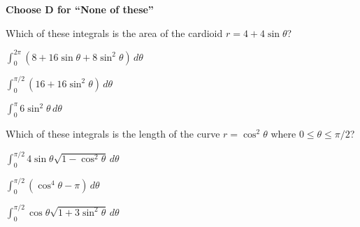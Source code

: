 \documentclass[12pt]{exam}
\newcommand{\<}{(}
\renewcommand{\>}{)}
\begin{document}
\begin{center}
\end{center}
\vspace{0.1in}

\vspace{12pt}

\textbf{Choose D for ``None of these''}

\begin{questions}\setcounter{question}{23}

\question
Which of these integrals is the area of the cardioid \(r=4+4\sin\theta\)?
\begin{choices}
\item \(\int_0^{2\pi}(8+16\sin\theta+8\sin^2\theta)\,d\theta\)
\item \(\int_0^{\pi/2}(16+16\sin^2\theta)\,d\theta\)
\item \(\int_0^{\pi}6\sin^2\theta\,d\theta\)
\end{choices}

\question
Which of these integrals is the length of the curve \(r=\cos^2\theta\)
where \(0\leq\theta\leq\pi/2\)?
\begin{choices}
\item \(\int_0^{\pi/2}4\sin\theta\sqrt{1-\cos^2\theta}\,d\theta\)
\item \(\int_0^{\pi/2}(\cos^4\theta-\pi)\,d\theta\)
\item \(\int_0^{\pi/2}\cos\theta\sqrt{1+3\sin^2\theta}\,d\theta\)
\end{choices}





\end{questions}
\end{document}
